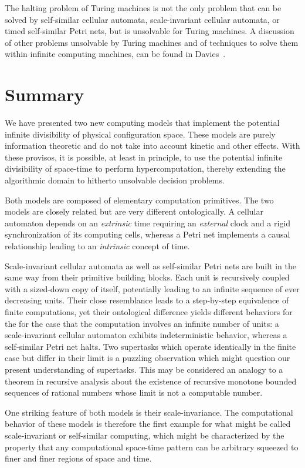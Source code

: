 \documentclass[pre,showpacs,showkeys,preprint]{revtex4}
\theoremstyle{definition}
\begin{document}
The halting problem of Turing machines is not the only problem that can be solved by self-similar cellular automata, scale-invariant cellular automata, or timed self-similar Petri nets, but is unsolvable for Turing machines.
A discussion of other problems unsolvable by Turing machines and of techniques to solve them within infinite computing machines, can be found in
Davies~\cite{Davies01}.

\section{Summary}

We have presented two new computing models that implement the potential
infinite divisibility of physical configuration space.
These models are purely information theoretic and
do not take into account kinetic and other
effects.
With these provisos, it is possible, at least in
principle, to use the potential infinite
divisibility of space-time to perform hypercomputation,
thereby extending the algorithmic domain to hitherto unsolvable decision problems.

Both models are composed of elementary computation primitives.
The two models are closely related but are very different ontologically.
A cellular automaton depends on an {\em extrinsic} time requiring an {\em external} clock
and a rigid synchronization of its computing cells, whereas
a Petri net implements a causal relationship leading to an {\em intrinsic} concept of time.

Scale-invariant cellular automata as well as self-similar Petri nets are built in the same way from their primitive building blocks.
Each unit is recursively coupled with a sized-down copy of itself, potentially leading
to an infinite sequence of ever decreasing units.
Their close resemblance leads to a step-by-step equivalence of finite computations,
yet their ontological difference yields different behaviors for the for the case that the computation involves an infinite number of units:
a scale-invariant cellular automaton exhibits indeterministic behavior, whereas a self-similar Petri net halts.
Two supertasks which operate identically in the finite case but differ in
their limit is a puzzling observation which might question our present understanding of supertasks.
This may be considered an analogy to a theorem \cite{Specker49} in recursive analysis
about the existence of recursive monotone bounded sequences of rational numbers
whose limit is not a computable number.

One striking feature of both models is their scale-invariance.
The computational behavior of these models is therefore the first example for what might be called
scale-invariant or self-similar computing, which might be characterized by the property that
any computational space-time pattern can be arbitrary squeezed to finer and finer regions of space and time.
\end{document}
